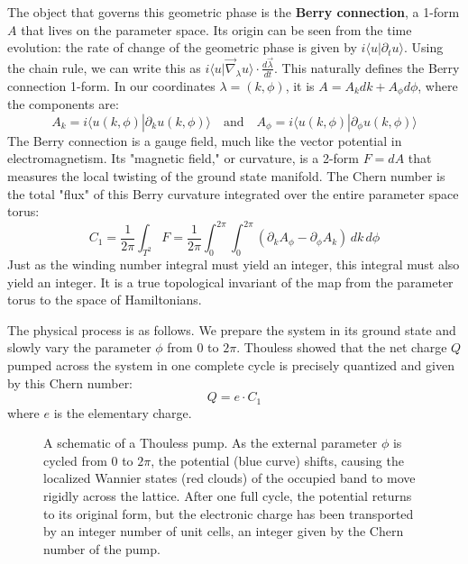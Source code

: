The object that governs this geometric phase is the \textbf{Berry connection}, a 1-form $A$ that lives on the parameter space.
Its origin can be seen from the time evolution: the rate of change of the geometric phase is given by $i\langle u | \partial_t u \rangle$.
Using the chain rule, we can write this as $i \langle u | \vec{\nabla}_\lambda u \rangle \cdot \frac{d\vec{\lambda}}{dt}$.
This naturally defines the Berry connection 1-form. In our coordinates $\lambda=(k, \phi)$, it is $A = A_k dk + A_\phi d\phi$, where the components are:
\begin{equation}
    A_k = i \langle u(k,\phi) | \partial_k u(k,\phi) \rangle \quad \text{and} \quad A_\phi = i \langle u(k,\phi) | \partial_\phi u(k,\phi) \rangle
\end{equation}
The Berry connection is a gauge field, much like the vector potential in electromagnetism.
Its "magnetic field," or curvature, is a 2-form $F = dA$ that measures the local twisting of the ground state manifold.
The Chern number is the total "flux" of this Berry curvature integrated over the entire parameter space torus:
\begin{equation}
    C_1 = \frac{1}{2\pi} \int_{T^2} F = \frac{1}{2\pi} \int_0^{2\pi} \int_0^{2\pi} (\partial_k A_\phi - \partial_\phi A_k) \,dk\,d\phi
\end{equation}
Just as the winding number integral must yield an integer, this integral must also yield an integer.
It is a true topological invariant of the map from the parameter torus to the space of Hamiltonians.

The physical process is as follows.
We prepare the system in its ground state and slowly vary the parameter $\phi$ from $0$ to $2\pi$.
Thouless showed that the net charge $Q$ pumped across the system in one complete cycle is precisely quantized and given by this Chern number:
\begin{equation}
    Q = e \cdot C_1
\end{equation}
where $e$ is the elementary charge.

\begin{figure}[htbp]
    \centering
    
    \caption{A schematic of a Thouless pump. As the external parameter $\phi$ is cycled from $0$ to $2\pi$, the potential (blue curve) shifts, causing the localized Wannier states (red clouds) of the occupied band to move rigidly across the lattice. After one full cycle, the potential returns to its original form, but the electronic charge has been transported by an integer number of unit cells, an integer given by the Chern number of the pump.}
    \label{fig:thouless_pump}
\end{figure}

